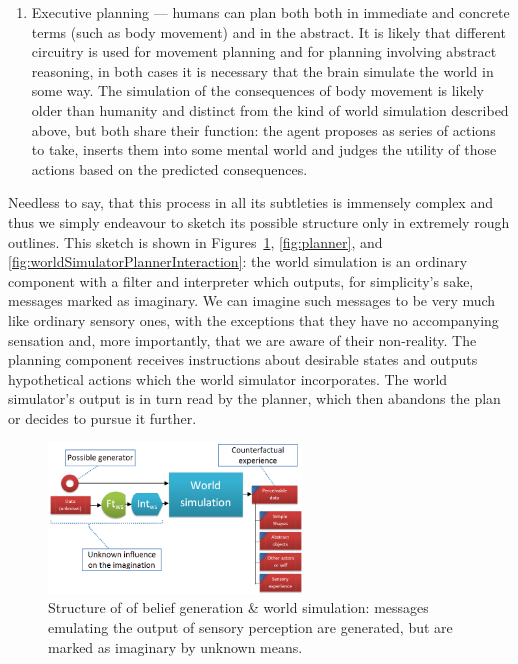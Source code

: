 \begin{enumerate}
	
	\item Executive planning --- humans can plan both both in immediate and concrete terms (such as body movement) and in the abstract. It is likely that different circuitry is used for movement planning and for planning involving abstract reasoning, in both cases it is necessary that the brain simulate the world in some way. The simulation of the consequences of body movement is likely older than humanity and distinct from the kind of world simulation described above, but both share their function: the agent proposes as series of actions to take, inserts them into some mental world and judges the utility of those actions based on the predicted consequences.
\end{enumerate}

Needless to say, that this process in all its subtleties is immensely complex and thus we simply endeavour to sketch its possible structure only in extremely rough outlines. This sketch is shown in Figures~\ref{fig:imagination},  \ref{fig:planner}, and \ref{fig:worldSimulatorPlannerInteraction}: the world simulation is an ordinary component with a filter and interpreter which outputs, for simplicity's sake, messages marked as imaginary. We can imagine such messages to be very much like ordinary sensory ones, with the exceptions that they have no accompanying sensation and, more importantly, that we are aware of their non-reality. The planning component receives instructions about desirable states and outputs hypothetical actions which the world simulator incorporates. The world simulator's output is in turn read by the planner, which then abandons the plan or decides to pursue it further.

\begin{figure}[t]
	\centering
	\includegraphics[width=0.6\textwidth]{Figs/imagination.png}
	\caption{Structure of of belief generation \& world simulation: messages emulating the output of sensory perception are generated, but are marked as imaginary by unknown means.}
	\label{fig:imagination}
\end{figure}

